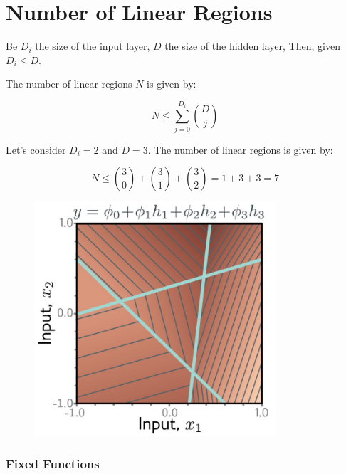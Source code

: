 \section{Number of Linear Regions}

Be $D_i$ the size of the input layer, $D$ the size of the hidden layer, Then, given $D_i \le D$. 

The number of linear regions $N$ is given by:

$$
N \le \sum_{j=0}^{D_i} \binom{D}{j}
$$

\begin{exampleblock}
    Let's consider $D_i = 2$ and $D = 3$. The number of linear regions is given by:

    \begin{minipage}{0.65\textwidth}
        $$
        N \le \binom{3}{0} + \binom{3}{1} + \binom{3}{2} = 1 + 3 + 3 = 7
        $$
    \end{minipage}%
    \begin{minipage}{0.3\textwidth}
        \begin{figure}[H]
            \centering
            \includegraphics[width=0.8\textwidth]{assets/regions.png}
        \end{figure}
    \end{minipage}
\end{exampleblock}

\subsubsection{Fixed Functions}



